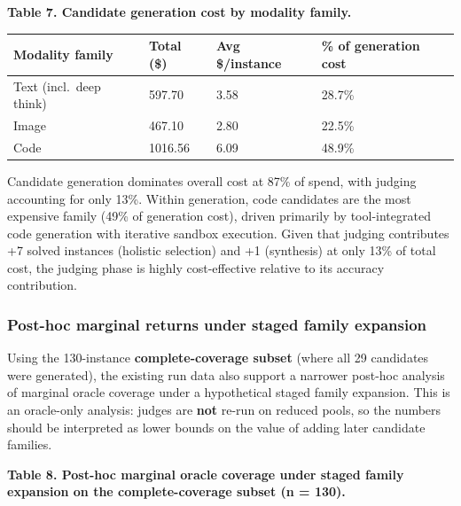 \documentclass[11pt]{article}
\begin{document}
\textbf{Table 7. Candidate generation cost by modality family.}

\begin{longtable}[]{@{}llll@{}}
\toprule\noalign{}
Modality family & Total (\$) & Avg \$/instance & \% of generation
cost \\
\midrule\noalign{}
\endhead
\bottomrule\noalign{}
\endlastfoot
Text (incl.~deep think) & 597.70 & 3.58 & 28.7\% \\
Image & 467.10 & 2.80 & 22.5\% \\
Code & 1016.56 & 6.09 & 48.9\% \\
\end{longtable}

Candidate generation dominates overall cost at 87\% of spend, with
judging accounting for only 13\%. Within generation, code candidates are
the most expensive family (49\% of generation cost), driven primarily by
tool-integrated code generation with iterative sandbox execution. Given
that judging contributes +7 solved instances (holistic selection) and +1
(synthesis) at only 13\% of total cost, the judging phase is highly
cost-effective relative to its accuracy contribution.

\hypertarget{post-hoc-marginal-returns-under-staged-family-expansion}{%
\subsubsection{Post-hoc marginal returns under staged family
expansion}\label{post-hoc-marginal-returns-under-staged-family-expansion}}

Using the 130-instance \textbf{complete-coverage subset} (where all 29
candidates were generated), the existing run data also support a
narrower post-hoc analysis of marginal oracle coverage under a
hypothetical staged family expansion. This is an oracle-only analysis:
judges are \textbf{not} re-run on reduced pools, so the numbers should
be interpreted as lower bounds on the value of adding later candidate
families.

\textbf{Table 8. Post-hoc marginal oracle coverage under staged family
expansion on the complete-coverage subset (n = 130).}
\end{document}
